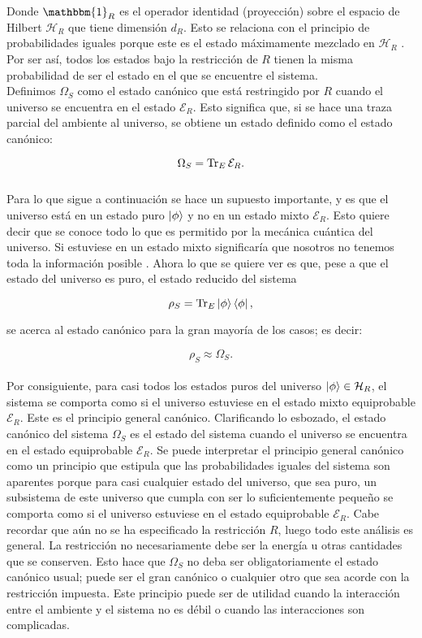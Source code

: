 Donde $\mathbbm{1}_{R}$ es el operador identidad (proyección) sobre el espacio de Hilbert  $\mathcal{H}_{R}$  que tiene dimensión $d_{R}$. Esto se relaciona con el principio de probabilidades iguales porque este es el estado máximamente mezclado en $\mathcal{H}_{R}$  \cite{SakuraiQuantum}. Por ser así, todos los estados bajo la restricción de $R$ tienen la misma probabilidad de ser el estado en el que se encuentre el sistema.
\\
Definimos $\Omega_{S}$ como el estado canónico que está restringido por $R$ cuando el universo se encuentra en el estado $\mathcal{E}_{R}$. Esto significa que, si se hace una traza parcial del ambiente al universo, se obtiene un estado definido como el estado canónico:

\begin{equation}
 \Omega_{S} =\Tr_{E} \mathcal{E}_{R}.
\end{equation}
\\
Para lo que sigue a continuación se hace un supuesto importante, y es que el universo está en un estado puro $\ket{\phi}$ y no en un estado mixto $\mathcal{E}_{R}$. Esto quiere decir que se conoce todo lo que es permitido por la mecánica cuántica del universo. Si estuviese en un estado mixto significaría que nosotros no tenemos toda la información posible \cite{SakuraiQuantum}. Ahora lo que se quiere ver es que, pese a que el estado del universo es puro, el estado reducido del sistema

\begin{equation}
\rho_{S}=\Tr_{E}\ket{\phi}\bra{\phi},
\end{equation}

se acerca al estado canónico para la gran mayoría de los casos; es decir:

\begin{equation}
\rho_{S} \approx \Omega_{S}.
\end{equation}
\\
Por consiguiente, para casi todos los estados puros del universo $\ket{\phi} \in \mathcal{H}_{R}$, el sistema se comporta como si el universo estuviese en el estado mixto equiprobable $\mathcal{E}_{R}$. Este es el principio general canónico. Clarificando lo esbozado, el estado canónico del sistema $\Omega_{S}$ es el estado del sistema cuando el universo se encuentra en el estado equiprobable $\mathcal{E}_{R}$. Se puede interpretar el principio general canónico como un principio que estipula que las probabilidades iguales del sistema son aparentes porque para casi cualquier estado del universo, que sea puro, un subsistema de este universo que cumpla con ser lo suficientemente pequeño se comporta como si el universo estuviese en el estado equiprobable $\mathcal{E}_{R}$. Cabe recordar que aún no se ha especificado la restricción $R$, luego todo este análisis es general. La restricción no necesariamente debe ser la energía u otras cantidades que se conserven. Esto hace que $\Omega_{S}$ no  deba ser obligatoriamente el estado canónico usual; puede ser el gran canónico o cualquier otro que sea acorde con la restricción impuesta\cite{ReichlStat}. Este principio puede ser de utilidad cuando la interacción entre el ambiente y el sistema no es débil o cuando las interacciones son complicadas.

